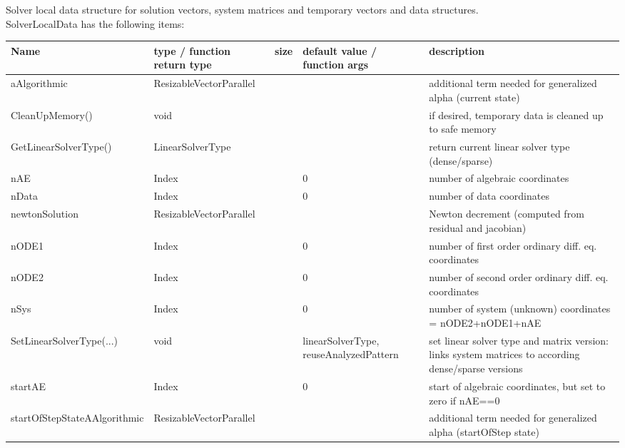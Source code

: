  \label{sec:SolverLocalData}
Solver local data structure for solution vectors, system matrices and temporary vectors and data structures.\\ 
%
SolverLocalData has the following items:
\begin{center}
  \footnotesize
  \begin{longtable}{| p{4.2cm} | p{2.5cm} | p{0.3cm} | p{3.0cm} | p{6cm} |}
    \hline
    \bf Name & \bf type / function return type & \bf size & \bf default value / function args & \bf description \\ \hline
    aAlgorithmic &     ResizableVectorParallel &      &      &     additional term needed for generalized alpha (current state)\\ \hline
    CleanUpMemory() &     void &      &      &     if desired, temporary data is cleaned up to safe memory\\ \hline
    GetLinearSolverType() &     LinearSolverType &      &      &     return current linear solver type (dense/sparse)\\ \hline
    nAE &     Index &      &     0 &     number of algebraic coordinates\\ \hline
    nData &     Index &      &     0 &     number of data coordinates\\ \hline
    newtonSolution &     ResizableVectorParallel &      &      &     Newton decrement (computed from residual and jacobian)\\ \hline
    nODE1 &     Index &      &     0 &     number of first order ordinary diff. eq. coordinates\\ \hline
    nODE2 &     Index &      &     0 &     number of second order ordinary diff. eq. coordinates\\ \hline
    nSys &     Index &      &     0 &     number of system (unknown) coordinates = nODE2+nODE1+nAE\\ \hline
    SetLinearSolverType(...) &     void &      &     linearSolverType, reuseAnalyzedPattern &     set linear solver type and matrix version: links system matrices to according dense/sparse versions\\ \hline
    startAE &     Index &      &     0 &     start of algebraic coordinates, but set to zero if nAE==0\\ \hline
    startOfStepStateAAlgorithmic &     ResizableVectorParallel &      &      &     additional term needed for generalized alpha (startOfStep state)\\ \hline

\end{longtable}
\end{center}
